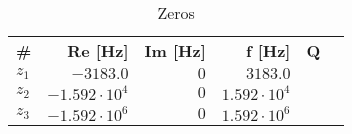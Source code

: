 \begin{table}[H]
\centering
\begin{tabular}[c]{lrrrrr}
\textbf{\#} & \textbf{Re [Hz]} & \textbf{Im [Hz]} & \textbf{f [Hz]} & \textbf{Q} \\ 
\rowcolor{myyellow}
$z_{1}$ &$-3183.0$ &$0$ &$3183.0$ \\ 
$z_{2}$ &$-1.592 \cdot 10^{4}$ &$0$ &$1.592 \cdot 10^{4}$ \\ 
\rowcolor{myyellow}
$z_{3}$ &$-1.592 \cdot 10^{6}$ &$0$ &$1.592 \cdot 10^{6}$ \\ 
\end{tabular}
\caption{Zeros}
\end{table}

